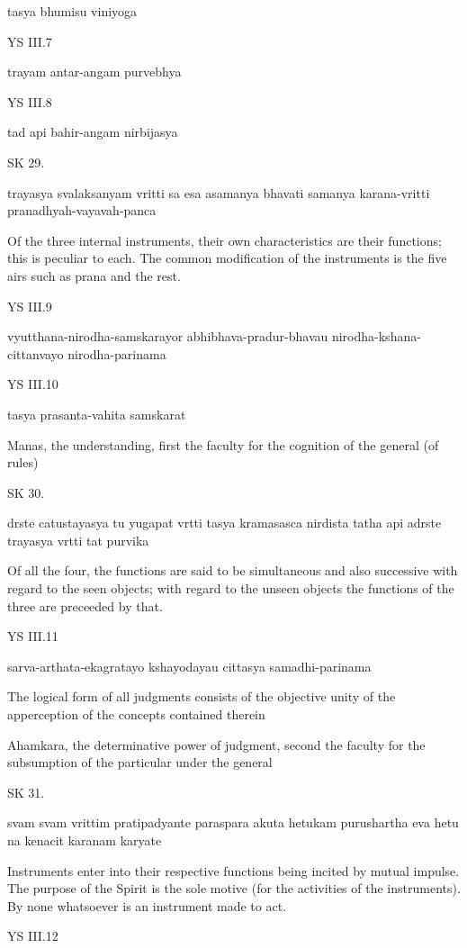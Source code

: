     tasya bhumisu viniyoga

YS III.7

    trayam antar-angam purvebhya

YS III.8

    tad api bahir-angam nirbijasya

SK 29.

trayasya svalaksanyam vritti sa esa asamanya bhavati
samanya karana-vritti pranadhyah-vayavah-panca

Of the three internal instruments,
their own characteristics are their functions;
this is peculiar to each.
The common modification of the instruments is the five airs
such as prana and the rest.

YS III.9

    vyutthana-nirodha-samskarayor abhibhava-pradur-bhavau
    nirodha-kshana-cittanvayo nirodha-parinama

YS III.10

    tasya prasanta-vahita samskarat

    Manas, the understanding, first the faculty
    for the cognition of the general (of rules)

SK 30.

drste catustayasya tu yugapat vrtti tasya kramasasca nirdista
tatha api adrste trayasya vrtti tat purvika

Of all the four, the functions are said to be
simultaneous and also successive
with regard to the seen objects;
with regard to the unseen objects
the functions of the three are preceeded by that.

YS III.11

    sarva-arthata-ekagratayo kshayodayau cittasya samadhi-parinama

    The logical form of all judgments consists of the objective unity of
    the apperception of the concepts contained therein

    Ahamkara, the determinative power of judgment,
    second the faculty for the subsumption of
    the particular under the general

SK 31.

svam svam vrittim pratipadyante paraspara akuta hetukam
purushartha eva hetu na kenacit karanam karyate

Instruments enter into their respective functions
being incited by mutual impulse.
The purpose of the Spirit is the sole motive
(for the activities of the instruments).
By none whatsoever is an instrument made to act.

YS III.12

